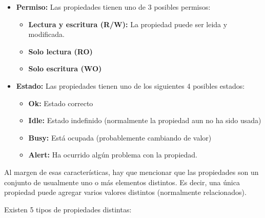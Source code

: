\begin{itemize}
  \item \textbf{Permiso:} Las propiedades tienen uno de 3 posibles permisos:
    \begin{itemize}
     \item \textbf{Lectura y escritura (R/W):} La propiedad puede ser leida y modificada.
     \item \textbf{Solo lectura (RO)}
     \item \textbf{Solo escritura (WO)}
    \end{itemize}

  \item \textbf{Estado:} Las propiedades tienen uno de los siguientes 4 posibles estados:
    \begin{itemize}
     \item \textbf{Ok:} Estado correcto
     \item \textbf{Idle:} Estado indefinido (normalmente la propiedad aun no ha sido usada)
     \item \textbf{Busy:} Está ocupada (probablemente cambiando de valor)
     \item \textbf{Alert:} Ha ocurrido algún problema con la propiedad.
    \end{itemize}
\end{itemize}

\bigskip
Al margen de esas características, hay que mencionar que las propiedades son un conjunto de usualmente uno o más elementos distintos. Es decir, una única propiedad puede agregar varios valores distintos (normalmente relacionados).

Existen 5 tipos de propiedades distintas:

